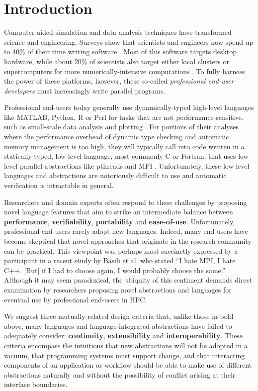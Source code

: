 \documentclass[9pt,preprint]{sigplanconf}
\begin{document}
\section{Introduction}
Computer-aided simulation and data analysis techniques have transformed science and engineering. Surveys show that scientists and engineers now spend up to 40\% of their time writing software \cite{howison2011scientific, hannay2009scientists}. Most of this software targets desktop hardware, while about 20\% of scientists also target either local clusters or super\-computers for more numerically-intensive computations \cite{hannay2009scientists}. To fully harness the power of these platforms, however, these so-called {\em professional end-user developers} \cite{segal2007some} must increasingly write parallel programs.

Professional end-users today generally use dynamically-typed high-level languages like MATLAB, Python, R or Perl for tasks that are not performance-sensitive, such as small-scale data analysis and plotting \cite{nguyen2010survey}. For portions of their analyses where the performance overhead of dynamic type checking and automatic memory management is too high, they will typically call into code written in a statically-typed, low-level language, most commonly C or Fortran, that uses low-level parallel abstractions like pthreads and MPI \cite{4222616,basili2008understanding}. Unfortunately, these low-level languages and abstractions are notoriously difficult to use and automatic verification is intractable in general.

Researchers and domain experts often respond to these challenges by proposing novel language features that aim to strike an intermediate balance between \textbf{performance}, \textbf{verifiability\-}, \textbf{portability} and \textbf{ease-of-use}.
Unfortunately, professional end-users rarely adopt new languages. Indeed, many end-users have become skeptical that novel approaches that originate in the research community can be  practical. This viewpoint was perhaps most succinctly expressed by a participant in a recent study by Basili et al. \cite{basili2008understanding} who stated ``I hate MPI, I hate C++. [But] if I had to choose again, I would probably choose the same.'' Although it may seem paradoxical, the ubiquity of this sentiment demands direct examination by researchers proposing novel abstractions and languages for eventual use by professional end-users in HPC.

We suggest three mutually-related {design criteria} that, unlike those in bold above, many languages and language-integrated abstractions have failed to adequately consider: \textbf{continuity}, \textbf{extensibility} and \textbf{interoperability}. These criteria encompass the intuitions that new abstractions will not be adopted in a vacuum, that programming systems must  support change, and that interacting components of an application or workflow should be able to make use of different abstractions naturally and without the possibility of conflict arising at their interface boundaries.
\end{document}
